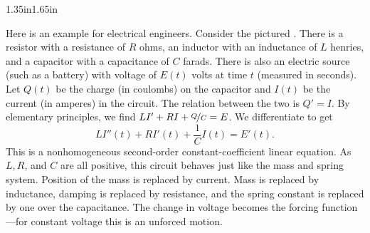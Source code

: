 \begin{mywrapfigsimp}[5]{1.35in}{1.65in}
\noindent
{}
\end{mywrapfigsimp}
Here is an example for electrical engineers.  Consider the
pictured .
There is a resistor with a resistance of $R$ ohms, an
inductor with an inductance of $L$ henries,
and a capacitor with a capacitance of $C$ farads.  There is also
an electric source (such as a battery) with voltage of $E(t)$ volts
at time $t$ (measured in seconds).
Let $Q(t)$ be the charge (in coulombs) on the capacitor
and $I(t)$ be the current (in amperes) in the circuit.  The relation between the two is
$Q' = I$.  By elementary principles, we find 
$L I' + RI + \nicefrac{Q}{C} = E$.   We differentiate to get
\begin{equation*}
L I''(t) + R I'(t) + \frac{1}{C} I(t) = E'(t) .
\end{equation*}
This is a nonhomogeneous second-order constant-coefficient linear equation.
As $L, R$, and $C$ are all positive, this circuit behaves just like the
mass and spring system.  Position of the mass is replaced by current.
Mass is replaced by inductance, damping is replaced by resistance, and
the spring constant is replaced by one over the capacitance.  The change in
voltage becomes the forcing function---for constant voltage this is an
unforced motion.

\medskip

